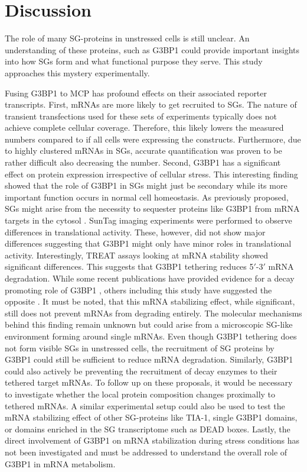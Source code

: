 \chapter{Discussion}


The role of many SG-proteins in unstressed cells is still unclear.
An understanding of these proteins, such as G3BP1 could provide important insights into how SGs form and what functional purpose they serve.
This study approaches this mystery experimentally.

Fusing G3BP1 to MCP has profound effects on their associated reporter transcripts.
First, mRNAs are more likely to get recruited to SGs.
The nature of transient transfections used for these sets of experiments typically does not achieve complete cellular coverage.
Therefore, this likely lowers the measured numbers compared to if all cells were expressing the constructs.
Furthermore, due to highly clustered mRNAs in SGs, accurate quantification was proven to be rather difficult also decreasing the number.
Second, G3BP1 has a significant effect on protein expression irrespective of cellular stress.
This interesting finding showed that the role of G3BP1 in SGs might just be secondary while its more important function occurs in normal cell homeostasis.
As previously proposed, SGs might arise from the necessity to sequester proteins like G3BP1 from mRNA targets in the cytosol \cite{fischer_structure-mediated_2020}.
SunTag imaging experiments were performed to observe differences in translational activity.
These, however, did not show major differences suggesting that G3BP1 might only have minor roles in translational activity.
Interestingly, TREAT assays looking at mRNA stability showed significant differences.
This suggests that G3BP1 tethering reduces 5$'$-3$'$ mRNA degradation.
While some recent publications have provided evidence for a decay promoting role of G3BP1 \cite{fischer_structure-mediated_2020, tourriere_rasgap-associated_2001}, others including this study have suggested the opposite \cite{aulas_g3bp1_2015, bley_stress_2015, laver_rna-binding_2020}.
It must be noted, that this mRNA stabilizing effect, while significant, still does not prevent mRNAs from degrading entirely.
The molecular mechanisms behind this finding remain unknown but could arise from a microscopic SG-like environment forming around single mRNAs.
Even though G3BP1 tethering does not form visible SGs in unstressed cells, the recruitment of SG proteins by G3BP1 could still be sufficient to reduce mRNA degradation.
Similarly, G3BP1 could also actively be preventing the recruitment of decay enzymes to their tethered target mRNAs.
To follow up on these proposals, it would be necessary to investigate whether the local protein composition changes proximally to tethered mRNAs.
A similar experimental setup could also be used to test the mRNA stabilizing effect of other SG-proteins like TIA-1, single G3BP1 domains, or domains enriched in the SG transcriptome such as DEAD boxes.
Lastly, the direct involvement of G3BP1 on mRNA stabilization during stress conditions has not been investigated and must be addressed to understand the overall role of G3BP1 in mRNA metabolism.

